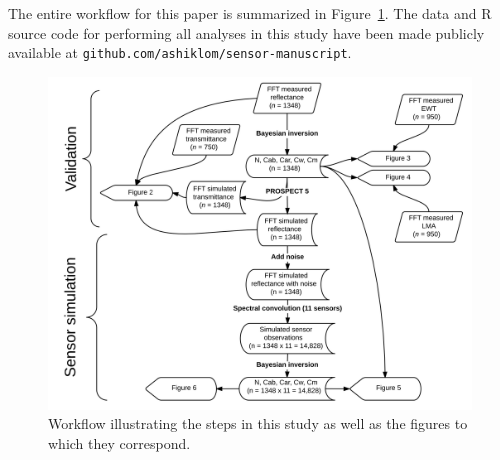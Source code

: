 The entire workflow for this paper is summarized in Figure~\ref{fig:pecanrtm-workflow}. %
The data and R source code for performing all analyses in this study have been made publicly available at \texttt{github.com/ashiklom/sensor-manuscript}.

\begin{figure}
  \centering
  \includegraphics[width=\textwidth]{2_rtm_inversion/figures/workflow.png}
  \caption{%
    Workflow illustrating the steps in this study as well as the figures to which they correspond.
  }\label{fig:pecanrtm-workflow}
\end{figure}

